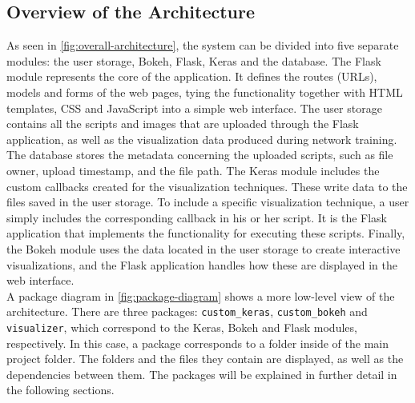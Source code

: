 \subsection{Overview of the Architecture}

As seen in \autoref{fig:overall-architecture}, the system can be divided into five separate modules: the user storage, Bokeh, Flask, Keras and the database. The Flask module represents the core of the application. It defines the routes (URLs), models and forms of the web pages, tying the functionality together with HTML templates, CSS and JavaScript into a simple web interface. The user storage contains all the scripts and images that are uploaded through the Flask application, as well as the visualization data produced during network training. The database stores the metadata concerning the uploaded scripts, such as file owner, upload timestamp, and the file path. The Keras module includes the custom callbacks created for the visualization techniques. These write data to the files saved in the user storage. To include a specific visualization technique, a user simply includes the corresponding callback in his or her script. It is the Flask application that implements the functionality for executing these scripts. Finally, the Bokeh module uses the data located in the user storage to create interactive visualizations, and the Flask application handles how these are displayed in the web interface. \\

\noindent A package diagram in \autoref{fig:package-diagram} shows a more low-level view of the architecture. There are three packages: \texttt{custom\_keras}, \texttt{custom\_bokeh} and \texttt{visualizer}, which correspond to the Keras, Bokeh and Flask modules, respectively. In this case, a package corresponds to a folder inside of the main project folder. The folders and the files they contain are displayed, as well as the dependencies between them. The packages will be explained in further detail in the following sections.

